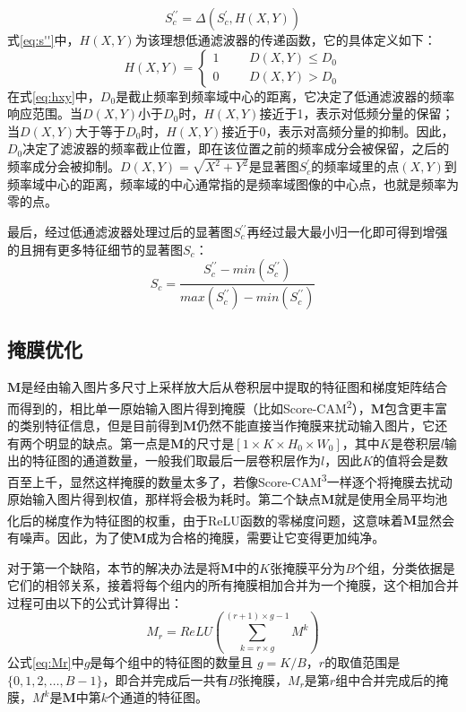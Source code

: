\begin{equation}
	S^{\prime\prime}_c= \Delta(S_c^{\prime},H(X,Y))
	\label{eq:s''}
\end{equation}
式\ref{eq:s''}中，$H(X,Y)$为该理想低通滤波器的传递函数，它的具体定义如下：
\begin{equation}
	H(X,Y)=\left\{
	\begin{aligned}
		1 &&& D(X,Y)\leq D_0 \\
		0 &&& D(X,Y) > D_0
	\end{aligned}
	\right.
	\label{eq:hxy}
\end{equation}
在式\ref{eq:hxy}中，$D_0$是截止频率到频率域中心的距离，它决定了低通滤波器的频率响应范围。当$D(X,Y)$小于$D_0$时，$H(X,Y)$接近于1，表示对低频分量的保留；当$D(X,Y)$大于等于$D_0$时，$H(X,Y)$接近于0，表示对高频分量的抑制。因此，$D_0$决定了滤波器的频率截止位置，即在该位置之前的频率成分会被保留，之后的频率成分会被抑制。$D(X,Y)=\sqrt{X^2+Y^2}$是显著图$S^{\prime}_c$的频率域里的点$(X,Y)$到频率域中心的距离，频率域的中心通常指的是频率域图像的中心点，也就是频率为零的点。

最后，经过低通滤波器处理过后的显著图$S^{\prime\prime}_c$再经过最大最小归一化即可得到增强的且拥有更多特征细节的显著图$S_c$：
\begin{equation}
	S_c=\frac{S_c^{\prime\prime}-min(S_c^{\prime\prime})}{max(S_c^{\prime\prime})-min(S_c^{\prime\prime})}
\end{equation}


\subsection{掩膜优化}
$\boldsymbol{M}$是经由输入图片多尺寸上采样放大后从卷积层中提取的特征图和梯度矩阵结合而得到的，相比单一原始输入图片得到掩膜（比如Score-CAM\textsuperscript{\cite{wang2020score}2}），$\boldsymbol{M}$包含更丰富的类别特征信息，但是目前得到$\boldsymbol{M}$仍然不能直接当作掩膜来扰动输入图片，它还有两个明显的缺点。第一点是$\boldsymbol{M}$的尺寸是$[1\times K \times H_0\times W_0]$，其中$K$是卷积层$l$输出的特征图的通道数量，一般我们取最后一层卷积层作为$l$，因此$K$的值将会是数百至上千，显然这样掩膜的数量太多了，若像Score-CAM\textsuperscript{\cite{wang2020score}3}一样逐个将掩膜去扰动原始输入图片得到权值，那样将会极为耗时。第二个缺点$\boldsymbol{M}$就是使用全局平均池化后的梯度作为特征图的权重，由于ReLU函数的零梯度问题\textsuperscript{\cite{zhang2021novel}}，这意味着$\boldsymbol{M}$显然会有噪声。因此，为了使$\boldsymbol{M}$成为合格的掩膜，需要让它变得更加纯净。

对于第一个缺陷，本节的解决办法是将$\boldsymbol{M}$中的$K$张掩膜平分为$B$个组，分类依据是它们的相邻关系，接着将每个组内的所有掩膜相加合并为一个掩膜，这个相加合并过程可由以下的公式计算得出：
\begin{equation}
	M_r=ReLU(\sum_{k=r\times g}^{(r+1)\times g-1}{M^k})
	\label{eq:Mr}
\end{equation}
公式\ref{eq:Mr}中$g$是每个组中的特征图的数量且 $g=K/B$，$r$的取值范围是$\{0,1,2,\dots,B-1\}$，即合并完成后一共有$B$张掩膜，$M_r$是第$r$组中合并完成后的掩膜，$M^k$是$\boldsymbol{M}$中第$k$个通道的特征图。

